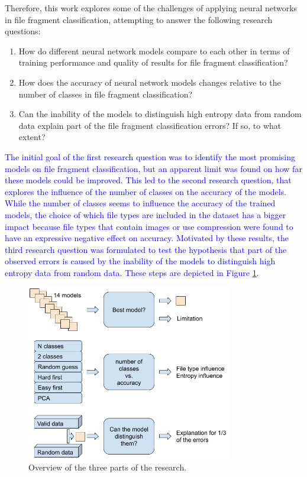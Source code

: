 
Therefore, this work explores some of the challenges of applying neural networks in file fragment classification, attempting to answer the following research questions:

\begin{enumerate}[itemindent=\parindent,label=\textbf{Q\arabic*.}]

    \item How do different neural network models compare to each other in terms of training performance and quality of results for file fragment classification?
    
    \item How does the accuracy of neural network models changes relative to the number of classes in file fragment classification?

    \item Can the inability of the models to distinguish high entropy data from random data explain part of the file fragment classification errors? If so, to what extent?
\end{enumerate}

\textcolor{blue}{The initial goal of the first research question was to identify the most promising models on file fragment classification, but an apparent limit was found on how far these models could be improved. This led to the second research question, that explores the influence of the number of classes on the accuracy of the models. While the number of classes seems to influence the accuracy of the trained models, the choice of which file types are included in the dataset has a bigger impact because file types that contain images or use compression were found to have an expressive negative effect on accuracy.
Motivated by these results, the third research question was formulated to test the hypothesis that part of the observed errors is caused by the inability of the models to distinguish high entropy data from random data. These steps are depicted in Figure \ref{fig:steps}.}


\noindent
\begin{figure}[htb!]
\centering\includegraphics[width=0.8\textwidth]{content/3phases.png}
\caption[Research parts]{\label{fig:steps}Overview of the three parts of the research.}%
\end{figure}

